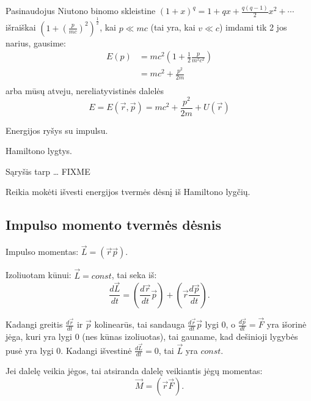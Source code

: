 Pasinaudojus Niutono binomo skleistine
$(1+x)^{q} = 1 + qx + \frac{q(q-1)}{2}x^{2}+\cdots$ išraiškai
$\left( 1 + \left( \frac{p}{mc} \right)^{2} \right)^{\frac{1}{2}}$, kai
$p \ll mc$ (tai yra, kai $v \ll c$) imdami tik 2 jos narius,
gausime:
\begin{align*}
  E(p)
  &= mc^{2}\left( 1 + \frac{1}{2}\frac{p}{m^{2}c^{2}} \right) \\
  &= mc^{2} + \frac{p^{2}}{2m} \\
\end{align*}
arba mūsų atveju, nereliatyvistinės dalelės
\begin{equation*}
  E
  = E(\vec{r}, \vec{p})
  = mc^{2} + \frac{p^{2}}{2m} + U(\vec{r})
\end{equation*}

\begin{remember}
  \item Energijos ryšys su impulsu.
  \item Hamiltono lygtys.
  \item Sąryšis tarp … FIXME
  \item Reikia mokėti išvesti energijos tvermės dėsnį iš Hamiltono
    lygčių.
\end{remember}

\subsection{Impulso momento tvermės dėsnis}

Impulso momentas: $\vec{L} = \left( \vec{r}\vec{p} \right)$.

Izoliuotam kūnui: $\vec{L} = const$, tai seka iš:
\begin{equation*}
  \frac{d\vec{L}}{dt} = \left( \frac{d\vec{r}}{dt} \vec{p} \right) +
  \left( \vec{r} \frac{d\vec{p}}{dt} \right).
\end{equation*}

Kadangi greitis $\frac{d\vec{r}}{dt}$ ir $\vec{p}$ kolinearūs, tai
sandauga $\frac{d\vec{r}}{dt}\vec{p}$ lygi 0,
o $\frac{d\vec{p}}{dt} = \vec{F}$ yra išorinė jėga, kuri yra
lygi 0 (nes kūnas izoliuotas), tai gauname, kad dešinioji
lygybės pusė yra lygi 0. Kadangi išvestinė $\frac{d\vec{L}}{dt} = 0$,
tai $\vec{L}$ yra $const$.

Jei dalelę veikia jėgos, tai atsiranda dalelę veikiantis jėgų
momentas:
\begin{equation*}
  \vec{M} = \left( \vec{r}\vec{F} \right).
\end{equation*}
